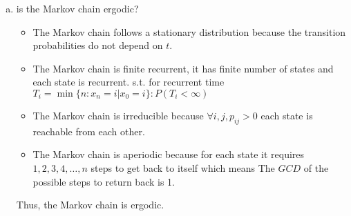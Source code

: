 \documentclass[12pt]{article}
\begin{document}
\begin{flushleft}
\begin{enumerate}[(a)]
\begin{equation*}
\begin{array}{cc}
        \end{array}\right) = (x,y)
    \end{equation*}
    From
    \begin{align*}
        \frac{3}{4} x + \frac{1}{3} y & = x \\
        \frac{1}{4} x + \frac{2}{3} y & = y \\
    \end{align*}
    we get
    \begin{align*}
       \frac{x}{y} = \frac{4}{3} \\
    \end{align*}
    Thus, the fraction of questions with answer $yes$ is $\displaystyle \frac{4}{3 + 4} = \frac{4}{7}$.
    \item is the Markov chain ergodic?
    \begin{itemize}
        \item The Markov chain follows a stationary distribution because the transition probabilities do not depend on $t$.
        \item The Markov chain is finite recurrent, it has finite number of states and each state is recurrent. s.t. for recurrent time $T_i = \min\{n: x_n = i | x_0 = i\}: P(T_i < \infty)$
        \item The Markov chain is irreducible because $\forall i, j, p_{ij} > 0$ each state is reachable from each other.
        \item The Markov chain is aperiodic because for each state it requires ${1, 2, 3, 4,\dots,n}$ steps to get back to 
        itself which means The $GCD$ of the possible steps to return back is 1.
    \end{itemize}
    Thus, the Markov chain is ergodic.
\end{enumerate}
\end{flushleft}
\end{document}
